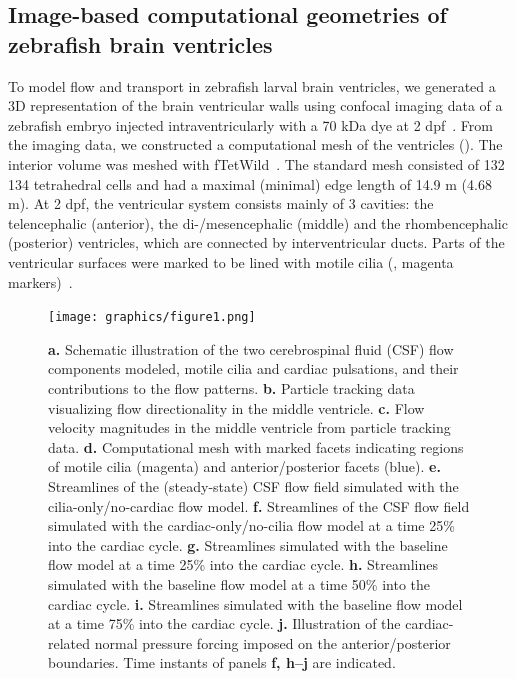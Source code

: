 \documentclass{WileyMSP-template}
\begin{document}
\subsection{Image-based computational geometries of zebrafish brain ventricles}
To model flow and transport in zebrafish larval brain ventricles, we generated a
3D representation of the brain ventricular walls using confocal imaging data of a zebrafish embryo
injected intraventricularly with a 70 kDa dye at 2 dpf~\cite{Olstad2019CiliaryDevelopment}. 
From the imaging data, we constructed a computational mesh of the ventricles ().
The interior volume was meshed with fTetWild~\cite{Hu2020FastWild}. 
The standard mesh consisted of 132 134 tetrahedral cells and had a
maximal (minimal) edge length of 14.9 \textmu m (4.68 \textmu m). 
At 2 dpf, the ventricular system consists mainly of 3 cavities: the telencephalic (anterior),
the di-/mesencephalic (middle) and the rhombencephalic (posterior) ventricles,
which are connected by interventricular ducts. 
Parts of the ventricular surfaces were marked to be lined with
motile cilia (, magenta markers)~\cite{Olstad2019CiliaryDevelopment}.
\begin{figure}%
    \centering
    \texttt{[image: graphics/figure1.png]}
    \caption{
    \textbf{a.} Schematic illustration of the two cerebrospinal fluid (CSF) flow components modeled,
    motile cilia and cardiac pulsations, and their contributions to the flow patterns.
    \textbf{b.} Particle tracking data visualizing flow directionality in the middle ventricle.
    \textbf{c.} Flow velocity magnitudes in the middle ventricle from particle tracking data.
    \textbf{d.} Computational mesh with marked facets indicating regions of motile cilia (magenta) and
    anterior/posterior facets (blue).
    \textbf{e.} Streamlines of the (steady-state) CSF flow field simulated with the
    cilia-only/no-cardiac flow model.
    \textbf{f.} Streamlines of the CSF flow field simulated with the cardiac-only/no-cilia flow
    model at a time 25\% into the cardiac cycle. %
    \textbf{g.} Streamlines simulated with the baseline flow model at
    a time 25\% into the cardiac cycle. %
    \textbf{h.} Streamlines simulated with the baseline flow model at
    a time 50\% into the cardiac cycle. %
    \textbf{i.} Streamlines simulated with the baseline flow model at
    a time 75\% into the cardiac cycle. %
    \textbf{j.} Illustration of the cardiac-related normal pressure forcing imposed on the
    anterior/posterior boundaries. Time instants of panels \textbf{f, h--j} are indicated.
    }
    \label{fig:fig1}
\end{figure}
\end{document}
